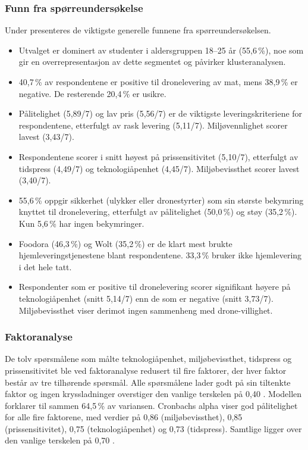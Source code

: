 \subsubsection*{Funn fra spørreundersøkelse}

Under presenteres de viktigste generelle funnene fra spørreundersøkelsen.

\begin{itemize}[leftmargin=1.5em, nosep]
  \item Utvalget er dominert av studenter i aldersgruppen 18--25 år
  (55,6\,\%), noe som gir en overrepresentasjon av dette
  segmentet og påvirker klusteranalysen.
  \item 40,7\,\% av respondentene er positive til dronelevering av mat,
  mens 38,9\,\% er negative. De resterende 20,4\,\% er usikre.
  \item Pålitelighet (5,89/7) og lav pris (5,56/7) er de viktigste
  leveringskriteriene for respondentene, etterfulgt av rask levering (5,11/7).
  Miljøvennlighet scorer lavest (3,43/7).
  \item Respondentene scorer i snitt høyest på prissensitivitet (5,10/7),
  etterfulgt av tidspress (4,49/7) og
  teknologiåpenhet (4,45/7). Miljøbevissthet scorer lavest (3,40/7).
  \item 55,6\,\% oppgir sikkerhet (ulykker eller dronestyrter) som sin
  største bekymring knyttet til dronelevering, etterfulgt av pålitelighet
  (50,0\,\%) og støy (35,2\,\%). Kun 5,6\,\% har ingen bekymringer.
  \item Foodora (46,3\,\%) og Wolt (35,2\,\%) er de klart mest brukte
  hjemleveringstjenestene blant respondentene. 33,3\,\% bruker ikke
  hjemlevering i det hele tatt.
  \item Respondenter som er positive til dronelevering scorer signifikant
  høyere på teknologiåpenhet (snitt 5,14/7) enn de som er negative (snitt
  3,73/7). Miljøbevissthet viser derimot ingen sammenheng med
  drone-villighet.
\end{itemize}

\subsubsection*{Faktoranalyse}

De tolv spørsmålene som målte teknologiåpenhet, miljøbevissthet, tidspress
og prissensitivitet ble ved faktoranalyse redusert til fire faktorer, der hver
faktor består av tre tilhørende spørsmål.
Alle spørsmålene lader godt på sin tiltenkte faktor og ingen kryssladninger
overstiger den vanlige terskelen på 0,40
\parencite[Forelesning 10]{aspelund2026_forelesninger}.
Modellen forklarer til sammen 64,5\,\% av variansen.
Cronbachs alpha viser god pålitelighet for alle
fire faktorene, med verdier på 0,86 (miljøbevissthet), 0,85
(prissensitivitet), 0,75 (teknologiåpenhet) og 0,73 (tidspress).
Samtlige ligger over den vanlige terskelen på 0,70
\parencite[Forelesning 10]{aspelund2026_forelesninger}.

